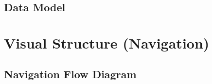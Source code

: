 \documentclass[11pt,english,numbers=endperiod,parskip=half]{scrartcl}
\begin{document}
  \subsection{Data Model}
  \begin{figure}[H]
  \end{figure}
\section{Visual Structure (Navigation)}
  \subsection{Navigation Flow Diagram}
    \begin{figure}[H]
      \\
    \end{figure}
\end{document}
